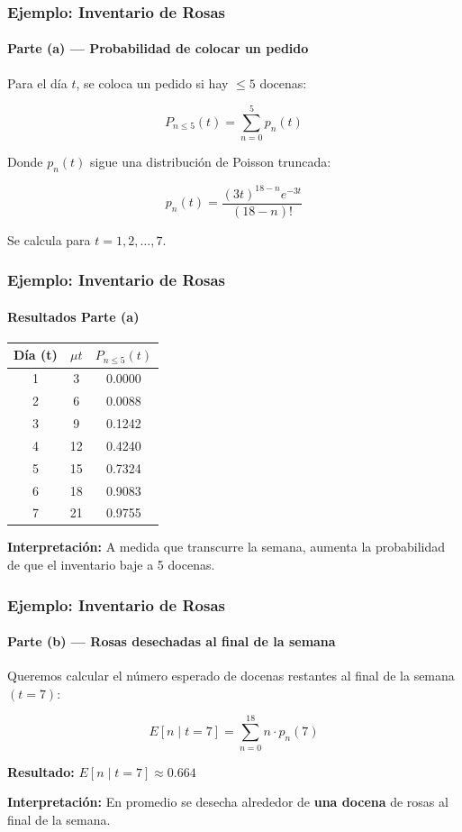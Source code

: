 \documentclass{beamer}
\begin{document}
\begin{frame}
\frametitle{Ejemplo: Inventario de Rosas}
\framesubtitle{Parte (a) — Probabilidad de colocar un pedido}

Para el día $t$, se coloca un pedido si hay $\leq 5$ docenas:

\[
P_{n \leq 5}(t) = \sum_{n = 0}^{5} p_n(t)
\]

Donde $p_n(t)$ sigue una distribución de Poisson truncada:

\[
p_n(t) = \frac{(3t)^{18 - n} e^{-3t}}{(18 - n)!}
\]

Se calcula para $t = 1, 2, \dots, 7$.
\end{frame}

\begin{frame}
\frametitle{Ejemplo: Inventario de Rosas}
\framesubtitle{Resultados Parte (a)}

\begin{center}
\begin{tabular}{|c|c|c|}
\hline
\textbf{Día (t)} & $\mu t$ & $P_{n \leq 5}(t)$ \\
\hline
1 & 3  & 0.0000 \\
2 & 6  & 0.0088 \\
3 & 9  & 0.1242 \\
4 & 12 & 0.4240 \\
5 & 15 & 0.7324 \\
6 & 18 & 0.9083 \\
7 & 21 & 0.9755 \\
\hline
\end{tabular}
\end{center}

\textbf{Interpretación:} A medida que transcurre la semana, aumenta la probabilidad de que el inventario baje a 5 docenas.
\end{frame}

\begin{frame}
\frametitle{Ejemplo: Inventario de Rosas}
\framesubtitle{Parte (b) — Rosas desechadas al final de la semana}

Queremos calcular el número esperado de docenas restantes al final de la semana $(t = 7)$:

\[
E[n \mid t = 7] = \sum_{n = 0}^{18} n \cdot p_n(7)
\]

\textbf{Resultado:} $E[n \mid t = 7] \approx 0.664$

\textbf{Interpretación:} En promedio se desecha alrededor de \textbf{una docena} de rosas al final de la semana.
\end{frame}
\end{document}
